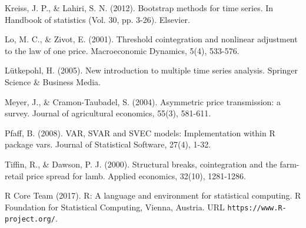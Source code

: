 Kreiss, J. P., \& Lahiri, S. N. (2012). Bootstrap methods for time series. In Handbook of statistics (Vol. 30, pp. 3-26). Elsevier.

Lo, M. C., \& Zivot, E. (2001). Threshold cointegration and nonlinear adjustment to the law of one price. Macroeconomic Dynamics, 5(4), 533-576.

Lütkepohl, H. (2005). New introduction to multiple time series analysis. Springer Science \& Business Media.

Meyer, J., \& Cramon-Taubadel, S. (2004). Asymmetric price transmission: a survey. Journal of agricultural economics, 55(3), 581-611.

 Pfaff, B. (2008). VAR, SVAR and SVEC models: Implementation within R package vars. Journal of Statistical Software, 27(4), 1-32.

Tiffin, R., \& Dawson, P. J. (2000). Structural breaks, cointegration and the farm-retail price spread for lamb. Applied economics, 32(10), 1281-1286.

R Core Team (2017). R: A language and environment for statistical computing.
  R Foundation for Statistical Computing, Vienna, Austria. URL
  \texttt{https://www.R-project.org/}.

  